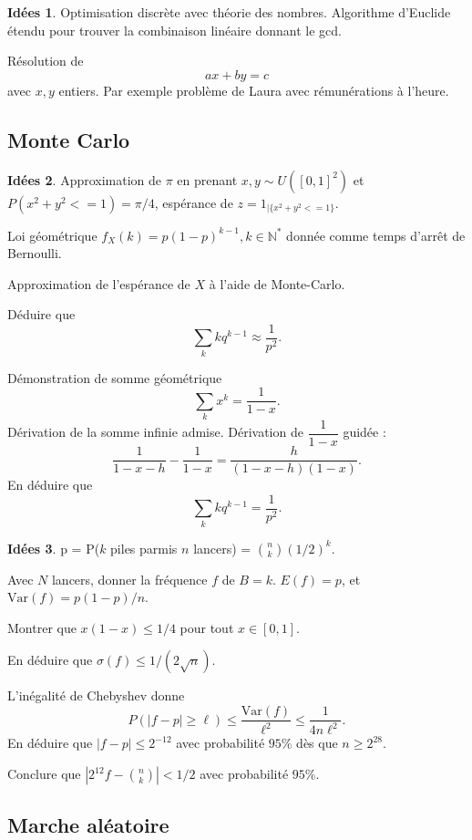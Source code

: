 \documentclass[a4paper,12pt, notitlepage]{article}
\theoremstyle{definition}
\newtheorem{idee}{Idées}
\newcommand{\N}{\mathbb{N}}
\newcommand{\Var}{\text{Var}}
\begin{document}
\begin{idee}
	Optimisation discrète avec théorie des nombres.
	Algorithme d'Euclide étendu pour trouver la combinaison linéaire donnant le gcd.
	
	Résolution de 
		\[ ax+ by = c \]
	avec $x,y$ entiers. Par exemple problème de Laura avec rémunérations à l'heure.

\end{idee}

\subsection{Monte Carlo}

\begin{idee}
	Approximation de $\pi$ en prenant $x,y \sim U([0,1]^2)$ et $P(x^2 + y^2 <= 1) = \pi/4$, espérance de $z = 1_{|\{x^2 + y^2 <= 1\}}$.

	Loi géométrique $f_X(k) = p(1-p)^{k-1}, k\in\N^*$ donnée comme temps d'arrêt de Bernoulli.
	
	Approximation de l'espérance de $X$ à l'aide de Monte-Carlo.
	
	Déduire que 
		\[ \sum_k k q^{k-1} \approx \dfrac1{p^2}. \]
		
	Démonstration de somme géométrique
		\[ \sum_k x^k = \dfrac1{1-x}. \]
	Dérivation de la somme infinie admise. Dérivation de $\dfrac1{1-x}$ guidée : 
		\[ \dfrac1{1-x-h} - \dfrac1{1-x} = \dfrac{h}{(1-x-h)(1-x)}. \]
	En déduire que
		\[ \sum_k k q^{k-1} = \dfrac1{p^2}. \]
	
\end{idee}

\begin{idee}
	p = P($k$ piles parmis $n$ lancers) = ${n \choose k} (1/2)^k$.
	
	Avec $N$ lancers, donner la fréquence $f$ de $B=k$.
	$E(f) = p$, et $\Var(f) = p(1-p)/n$.
	
	Montrer que $x(1-x) \leq 1/4$ pour tout $x\in[0,1]$.
	
	En déduire que $\sigma(f) \leq 1/(2\sqrt{n})$.
	
	L'inégalité de Chebyshev donne
		\[ P( |f - p| \geq \ell ) \leq \dfrac{\Var(f)}{\ell^2} \leq \dfrac1{4n\ell^2}. \]
	En déduire que $|f-p| \leq 2^{-12}$ avec probabilité $95\%$ dès que $n \geq 2^28$.
	
	Conclure que $|2^{12} f - {n \choose k}| < 1/2$ avec probabilité $95\%$.
\end{idee}

\subsection{Marche aléatoire}
\end{document}
